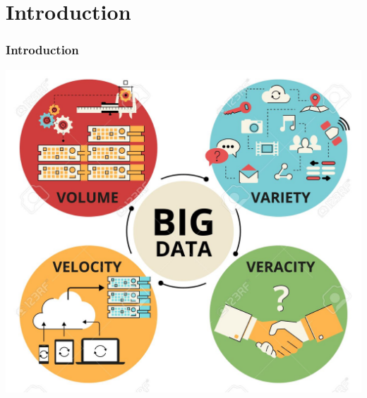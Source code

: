 \section*{Introduction}
\begin{frame}
    \frametitle{Introduction}
    \centering
    \includegraphics[scale=0.23]{figures/bigdata.jpg}
\end{frame}
